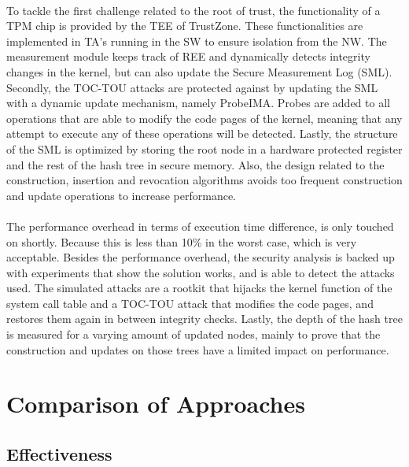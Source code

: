 \paragraph*{}
To tackle the first challenge related to the root of trust, the functionality of a TPM chip is provided by the TEE of TrustZone. These functionalities are implemented in TA's running in the SW to ensure isolation from the NW. The measurement module keeps track of REE and dynamically detects integrity changes in the kernel, but can also update the Secure Measurement Log (SML). Secondly, the TOC-TOU attacks are protected against by updating the SML with a dynamic update mechanism, namely ProbeIMA. Probes are added to all operations that are able to modify the code pages of the kernel, meaning that any attempt to execute any of these operations will be detected. Lastly, the structure of the SML is optimized by storing the root node in a hardware protected register and the rest of the hash tree in secure memory. Also, the design related to the construction, insertion and revocation algorithms avoids too frequent construction and update operations to increase performance.

\paragraph*{}
The performance overhead in terms of execution time difference, is only touched on shortly. Because this is less than 10\% in the worst case, which is very acceptable. Besides the performance overhead, the security analysis is backed up with experiments that show the solution works, and is able to detect the attacks used. The simulated attacks are a rootkit that hijacks the kernel function of the system call table and a TOC-TOU attack that modifies the code pages, and restores them again in between integrity checks. Lastly, the depth of the hash tree is measured for a varying amount of updated nodes, mainly to prove that the construction and updates on those trees have a limited impact on performance.

\section{Comparison of Approaches}

\subsection*{Effectiveness}


